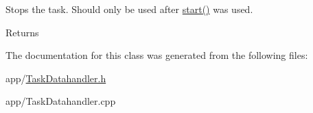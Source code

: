 Stops the task. Should only be used after \hyperlink{class_task_datahandler_a4643728911a09ec5af8f81bf92205f12}{start()} was used. 

\begin{DoxyReturn}{Returns}

\end{DoxyReturn}


The documentation for this class was generated from the following files\+:\begin{DoxyCompactItemize}
\item 
app/\hyperlink{_task_datahandler_8h}{Task\+Datahandler.\+h}\item 
app/Task\+Datahandler.\+cpp\end{DoxyCompactItemize}
